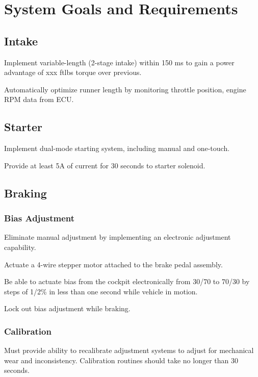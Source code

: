 \chapter{System Goals and Requirements}



\section{Intake}

Implement variable-length (2-stage intake) within 150 ms to gain a
power advantage of xxx ftlbs torque over previous.

Automatically optimize runner length by monitoring throttle position,
engine RPM data from ECU.


\section{Starter}

Implement dual-mode starting system, including manual and one-touch.

Provide at least 5A of current for 30 seconds to starter solenoid.


\section{Braking}


\subsection{Bias Adjustment}

Eliminate manual adjustment by implementing an electronic adjustment
capability. 

Actuate a 4-wire stepper motor attached to the brake pedal assembly.

Be able to actuate bias from the cockpit electronically from 30/70
to 70/30 by steps of 1/2\% in less than one second while vehicle in
motion.

Lock out bias adjustment while braking.


\subsection{Calibration}

Must provide ability to recalibrate adjustment systems to adjust for
mechanical wear and inconsistency. Calibration routines should take
no longer than 30 seconds. 


